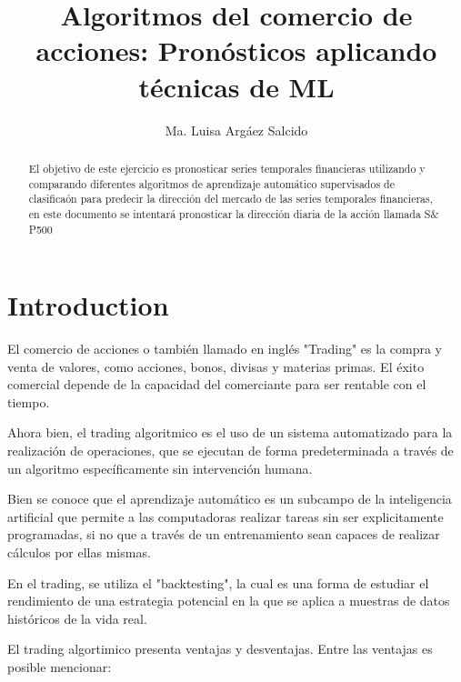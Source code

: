 \documentclass{article}
\title{Algoritmos del comercio de acciones: Pronósticos aplicando técnicas de ML}
\author{Ma. Luisa Argáez Salcido}
\begin{document}
\maketitle

\begin{abstract}
El objetivo de este ejercicio es pronosticar series temporales financieras utilizando y comparando diferentes algoritmos de aprendizaje automático supervisados de clasificaón para predecir la dirección del mercado de las series temporales financieras, en este documento se  intentará pronosticar la dirección diaria de la acción llamada S$\&$P500 
\end{abstract}

\section{Introduction}

El comercio de acciones o también llamado en inglés "Trading" es  la compra y venta de valores, como acciones, bonos, divisas y materias primas. El éxito comercial depende de la capacidad del comerciante para ser rentable con el tiempo.\cite{halls-moore}

Ahora bien, el trading algoritmico es el uso de un sistema automatizado para la realización de operaciones, que se ejecutan de forma predeterminada a través de un algoritmo específicamente sin intervención humana.\cite{halls-moore}

Bien se conoce que el aprendizaje automático es un subcampo de la inteligencia artificial que permite a las computadoras realizar tareas sin ser explicitamente programadas, si no que a través de un entrenamiento sean capaces de realizar cálculos por ellas mismas.

En el trading, se utiliza el "backtesting", la cual es una forma de estudiar el rendimiento de una estrategia potencial en la que se aplica a muestras de datos históricos de la vida real. 

El trading algortimico presenta ventajas y desventajas. Entre las ventajas es posible mencionar: 
\end{document}
